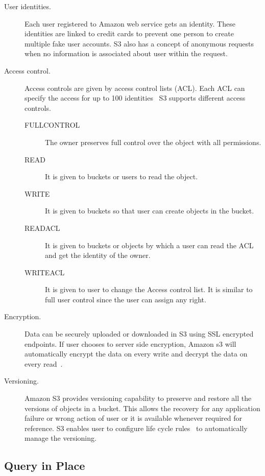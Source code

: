 \begin{description}

\item [User identities.] Each user registered to Amazon web service gets an
identity. These identities are linked to credit cards to prevent one person to
create multiple fake user accounts. S3 also has a concept of anonymous requests
when no information is associated about user within the request.

\item [Access control.] Access controls are given by access control lists (ACL).
Each ACL can specify the access for up to 100 
identities~\cite{hid-sp18-420-amazon-S3-details}
S3 supports different access controls.

\begin{description}
\item [FULLCONTROL] The owner preserves full control over the object with all
permissions.
\item [READ] It is given to buckets or users to read the object.
\item [WRITE] It is given to buckets so that user can create objects in the
bucket.
\item [READACL] It is given to buckets or objects by which a user can read the
ACL and get the identity of the owner.
\item [WRITEACL] It is given to user to change the Access control list. It is
similar to full user control since the user can assign any right.
\end{description}

\item [Encryption.] Data can be securely uploaded or downloaded in S3 using SSL
encrypted endpoints. If user chooses to server side encryption, Amazon s3 will
automatically encrypt the data on every write and decrypt the data on every
read~\cite{hid-sp18-420-amazon-S3-data-encryption}.

\item [Versioning.] Amazon S3 provides versioning capability to preserve and
restore all the versions of objects in a bucket. This allows the recovery for
any application failure or wrong action of user or it is available whenever
required for reference. S3 enables user to configure life cycle
rules~\cite{hid-sp18-420-amazon-S3-lidecycle-rule} to automatically manage the
versioning.

\end{description}


\subsection{Query in Place} 

